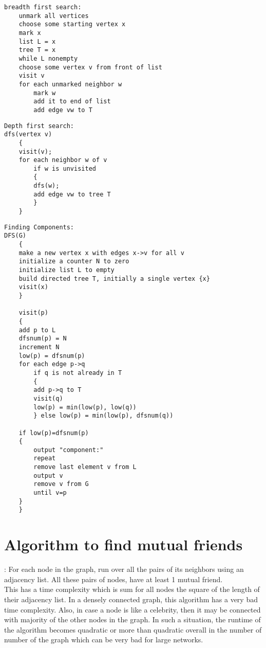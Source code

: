 \begin{verbatim}
breadth first search:
    unmark all vertices
    choose some starting vertex x
    mark x
    list L = x
    tree T = x
    while L nonempty
    choose some vertex v from front of list
    visit v
    for each unmarked neighbor w
        mark w
        add it to end of list
        add edge vw to T

\end{verbatim}

\begin{verbatim}
Depth first search:
dfs(vertex v)
    {
    visit(v);
    for each neighbor w of v
        if w is unvisited
        {
        dfs(w);
        add edge vw to tree T
        }
    }

\end{verbatim}


\begin{verbatim}
Finding Components:
DFS(G)
    {
    make a new vertex x with edges x->v for all v
    initialize a counter N to zero
    initialize list L to empty
    build directed tree T, initially a single vertex {x}
    visit(x)
    }

    visit(p)
    {
    add p to L
    dfsnum(p) = N
    increment N
    low(p) = dfsnum(p)
    for each edge p->q
        if q is not already in T
        {
        add p->q to T
        visit(q)
        low(p) = min(low(p), low(q))
        } else low(p) = min(low(p), dfsnum(q))

    if low(p)=dfsnum(p)
    {
        output "component:"
        repeat
        remove last element v from L
        output v
        remove v from G
        until v=p
    }
    }
\end{verbatim}

\section{Algorithm to find mutual friends}:
For each node in the graph, run over all the pairs of its neighbors using an adjacency list. All these pairs of nodes, have at least 1 mutual friend.
\\
This has a time complexity which is sum for all nodes the square of the length of their adjacency list. In a densely connected graph, this algorithm has a very bad time complexity. Also, in case a node is like a celebrity, then it may be connected with majority of the other nodes in the graph. In such a situation, the runtime of the algorithm becomes quadratic or more than quadratic overall in the number of number of the graph which can be very bad for large networks.

